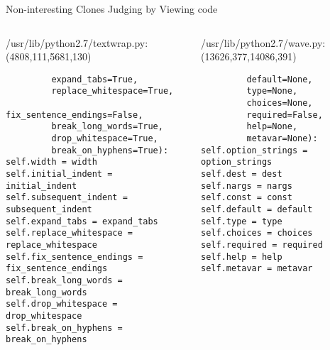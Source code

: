 \begin{frame}[shrink=30,fragile]{Non-interesting Clones Judging by Viewing code}

\lstset{
    breaklines=true,
    language=Python
}

\begin{columns}
\begin{column}[t]{0.48\textwidth}
/usr/lib/python2.7/textwrap.py:(4808,111,5681,130)
\begin{lstlisting}
         expand_tabs=True,
         replace_whitespace=True,
         fix_sentence_endings=False,
         break_long_words=True,
         drop_whitespace=True,
         break_on_hyphens=True):
self.width = width
self.initial_indent = initial_indent
self.subsequent_indent = subsequent_indent
self.expand_tabs = expand_tabs
self.replace_whitespace = replace_whitespace
self.fix_sentence_endings = fix_sentence_endings
self.break_long_words = break_long_words
self.drop_whitespace = drop_whitespace
self.break_on_hyphens = break_on_hyphens
\end{lstlisting}
\end{column}

\begin{column}[t]{0.48\textwidth}
/usr/lib/python2.7/wave.py:(13626,377,14086,391)
\begin{lstlisting}
         default=None,
         type=None,
         choices=None,
         required=False,
         help=None,
         metavar=None):
self.option_strings = option_strings
self.dest = dest
self.nargs = nargs
self.const = const
self.default = default
self.type = type
self.choices = choices
self.required = required
self.help = help
self.metavar = metavar
\end{lstlisting}

\end{column}
\end{columns}

\end{frame}

